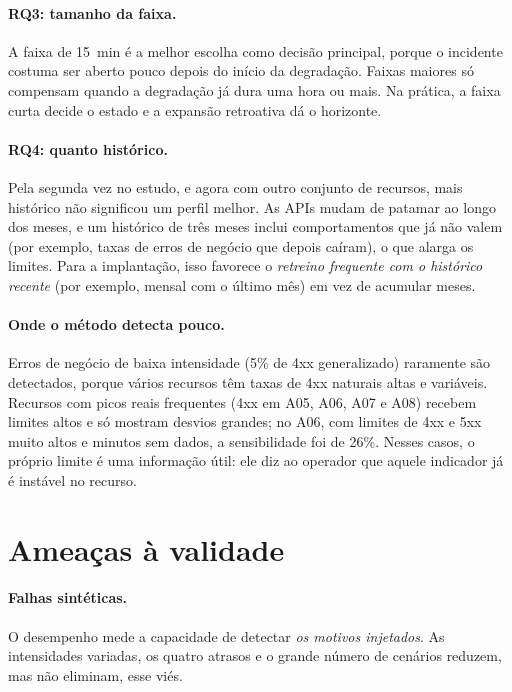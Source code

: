 \documentclass[sigconf,nonacm]{acmart}
\begin{document}
\paragraph{RQ3: tamanho da faixa.} A faixa de 15~min é a melhor escolha como decisão principal, porque o incidente costuma ser aberto pouco depois do início da degradação. Faixas maiores só compensam quando a degradação já dura uma hora ou mais. Na prática, a faixa curta decide o estado e a expansão retroativa dá o horizonte.

\paragraph{RQ4: quanto histórico.} Pela segunda vez no estudo, e agora com outro conjunto de recursos, mais histórico não significou um perfil melhor. As APIs mudam de patamar ao longo dos meses, e um histórico de três meses inclui comportamentos que já não valem (por exemplo, taxas de erros de negócio que depois caíram), o que alarga os limites. Para a implantação, isso favorece o \emph{retreino frequente com o histórico recente} (por exemplo, mensal com o último mês) em vez de acumular meses.

\paragraph{Onde o método detecta pouco.} Erros de negócio de baixa intensidade (5\% de 4xx generalizado) raramente são detectados, porque vários recursos têm taxas de 4xx naturais altas e variáveis. Recursos com picos reais frequentes (4xx em A05, A06, A07 e A08) recebem limites altos e só mostram desvios grandes; no A06, com limites de 4xx e 5xx muito altos e minutos sem dados, a sensibilidade foi de 26\%. Nesses casos, o próprio limite é uma informação útil: ele diz ao operador que aquele indicador já é instável no recurso.

\section{Ameaças à validade}\label{sec:ameacas}

\paragraph{Falhas sintéticas.} O desempenho mede a capacidade de detectar \emph{os motivos injetados}. As intensidades variadas, os quatro atrasos e o grande número de cenários reduzem, mas não eliminam, esse viés.
\end{document}
